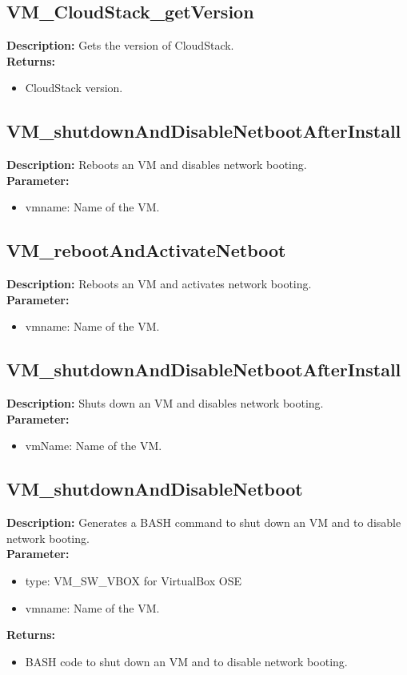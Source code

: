 \subsection{VM\_CloudStack\_getVersion}
\textbf{Description:} Gets the version of CloudStack.\\
\textbf{Returns:}
\begin{itemize}
\item CloudStack version.
\end{itemize}

\subsection{VM\_shutdownAndDisableNetbootAfterInstall}
\textbf{Description:} Reboots an VM and disables network booting.\\
\textbf{Parameter:}
\begin{itemize}
\item vmname: Name of the VM.
\end{itemize}

\subsection{VM\_rebootAndActivateNetboot}
\textbf{Description:} Reboots an VM and activates network booting.\\
\textbf{Parameter:}
\begin{itemize}
\item vmname: Name of the VM.
\end{itemize}

\subsection{VM\_shutdownAndDisableNetbootAfterInstall}
\textbf{Description:} Shuts down an VM and disables network booting.\\
\textbf{Parameter:}
\begin{itemize}
\item vmName: Name of the VM.
\end{itemize}

\subsection{VM\_shutdownAndDisableNetboot}
\textbf{Description:} Generates a BASH command to shut down an VM and to disable network booting.\\
\textbf{Parameter:}
\begin{itemize}
\item type: VM\_SW\_VBOX for VirtualBox OSE
\item vmname: Name of the VM.
\end{itemize}
\textbf{Returns:}
\begin{itemize}
\item BASH code to shut down an VM and to disable network booting.
\end{itemize}

